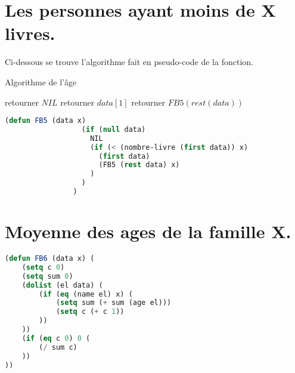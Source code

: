 \documentclass[a4paper, 12pt, leqno]{report}
\theoremstyle{plain}
\begin{document}
       \section{Les personnes ayant moins de X livres.}
        Ci-dessous se trouve l'algorithme fait en pseudo-code de la fonction.
        \begin{algorithm}
            \caption{Algorithme de l'âge}
            \begin{algorithmic}
                    \State retourner $NIL$
                    \State retourner $data[1]$
                \Else
                    \State retourner $FB5(rest (data))$    
                \EndIf      
            \end{algorithmic}
            \end{algorithm}
            \begin{lstlisting}[label=some-code,caption=FB5(data X),language=lisp]
                (defun FB5 (data x) 
                  (if (null data) 
                    NIL
	                (if (< (nombre-livre (first data)) x) 
	                  (first data) 
	                  (FB5 (rest data) x)
	                )
	              )
                )
            \end{lstlisting}       
            
           \section{Moyenne des ages de la famille X.}
        
            \begin{lstlisting}[label=some-code,caption=FB6(data X),language=lisp]
                (defun FB6 (data x) (
    (setq c 0)
    (setq sum 0)
    (dolist (el data) (
        (if (eq (name el) x) (
            (setq sum (+ sum (age el)))
            (setq c (+ c 1))
        ))
    ))
    (if (eq c 0) 0 (
        (/ sum c)
    ))
))
            \end{lstlisting}                 
\end{document}
